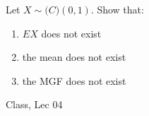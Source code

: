 \begin{samepage}
\begin{ex}
Let $X \sim \mathcal(C)(0,1)$. Show that:
    \begin{enumerate}
        \item $EX$ does not exist 
        \item the mean does not exist
        \item the MGF does not exist
    \end{enumerate}
\end{ex}
\begin{source}
Class, Lec 04
\end{source}
\end{samepage}
